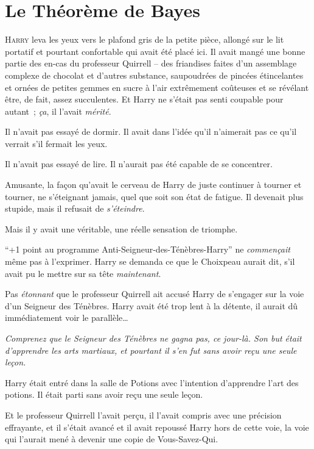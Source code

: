 \chapter{Le Théorème de Bayes}

\lettrine{H}{arry} leva les yeux vers le plafond gris de la petite pièce, allongé sur le lit portatif et pourtant confortable qui avait été placé ici. Il avait mangé une bonne partie des en-cas du professeur Quirrell -- des friandises faites d'un assemblage complexe de chocolat et d'autres substance, saupoudrées de pincées étincelantes et ornées de petites gemmes en sucre à l'air extrêmement coûteuses et se révélant être, de fait, assez succulentes. Et Harry ne s'était pas senti coupable pour autant~; \emph{ça}, il l'avait \emph{mérité}.

Il n'avait pas essayé de dormir. Il avait dans l'idée qu'il n'aimerait pas ce qu'il verrait s'il fermait les yeux.

Il n'avait pas essayé de lire. Il n'aurait pas été capable de se concentrer.

Amusante, la façon qu'avait le cerveau de Harry de juste continuer à tourner et tourner, ne s'éteignant jamais, quel que soit son état de fatigue. Il devenait plus stupide, mais il refusait de \emph{s'éteindre}.

Mais il y avait une véritable, une réelle sensation de triomphe.

“+1 point au programme Anti-Seigneur-des-Ténèbres-Harry” ne \emph{commençait} même pas à l'exprimer. Harry se demanda ce que le Choixpeau aurait dit, s'il avait pu le mettre sur sa tête \emph{maintenant}.

Pas \emph{étonnant} que le professeur Quirrell ait accusé Harry de s'engager sur la voie d'un Seigneur des Ténèbres. Harry avait été trop lent à la détente, il aurait dû immédiatement voir le parallèle…

\emph{Comprenez que le Seigneur des Ténèbres ne gagna pas, ce jour-là. Son but était d'apprendre les arts martiaux, et pourtant il s'en fut sans avoir reçu une seule leçon.}

Harry était entré dans la salle de Potions avec l'intention d'apprendre l'art des potions. Il était parti sans avoir reçu une seule leçon.

Et le professeur Quirrell l'avait perçu, il l'avait compris avec une précision effrayante, et il s'était avancé et il avait repoussé Harry hors de cette voie, la voie qui l'aurait mené à devenir une copie de Vous-Savez-Qui.

